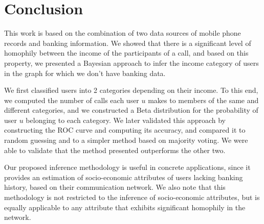 \chapter{Conclusion}

This work is based on the combination of two data sources of mobile phone records and banking information. We showed that there is a significant level of homophily between the income of the participants of a call, and based on this property, we presented a Bayesian approach to infer the income category of users in the graph for which we don't have banking data.

We first classified users into 2 categories depending on their income. To this end, we computed the number of calls each user \( u \) makes to members of the same and different categories, and we constructed a Beta distribution for the probability of user \( u \) belonging to each category. We later validated this approach by constructing the ROC curve and computing its accuracy, and compared it to random guessing and to a simpler method based on majority voting. We were able to validate that the method presented outperforms the other two.

Our proposed inference methodology is useful in concrete applications, since it provides an estimation of socio-economic attributes of users lacking banking history, based on their communication network. We also note that this methodology is not restricted to the inference of socio-economic attributes, but is equally applicable to any attribute that exhibits significant homophily in the network.

%
%
%
%
%
%
